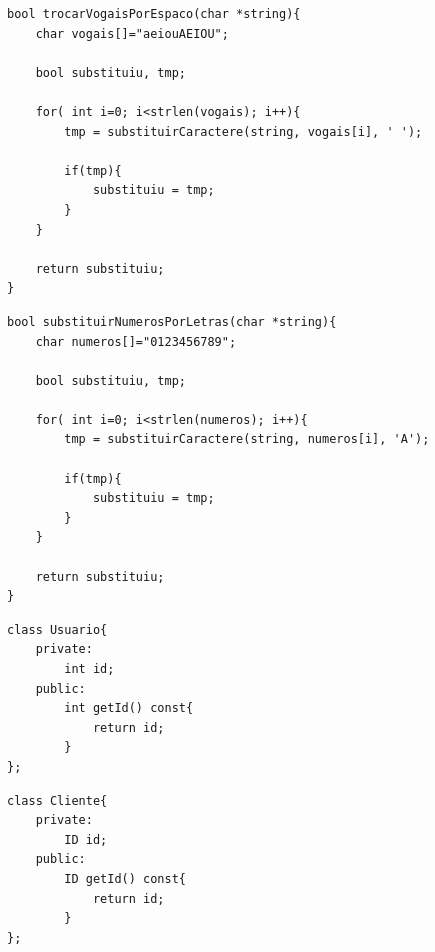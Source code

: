 \begin{frame}[fragile]

	\begin{listing}[H]
		\begin{verbatim}
bool trocarVogaisPorEspaco(char *string){
	char vogais[]="aeiouAEIOU";

	bool substituiu, tmp;

	for( int i=0; i<strlen(vogais); i++){
		tmp = substituirCaractere(string, vogais[i], ' ');

		if(tmp){
			substituiu = tmp;
		}
	}

	return substituiu;
}
		\end{verbatim}
	\end{listing}

\end{frame}

\begin{frame}[fragile]

	\begin{listing}[H]
		\begin{verbatim}
bool substituirNumerosPorLetras(char *string){
	char numeros[]="0123456789";

	bool substituiu, tmp;

	for( int i=0; i<strlen(numeros); i++){
		tmp = substituirCaractere(string, numeros[i], 'A');

		if(tmp){
			substituiu = tmp;
		}
	}

	return substituiu;
}
		\end{verbatim}
	\end{listing}

\end{frame}


\begin{frame}[fragile]

	\begin{listing}[H]
		\begin{verbatim}
class Usuario{
	private:
		int id;
	public:
		int getId() const{
			return id;
		}
};
		\end{verbatim}
	\end{listing}

\end{frame}

\begin{frame}[fragile]

	\begin{listing}[H]
		\begin{verbatim}
class Cliente{
	private:
		ID id;
	public:
		ID getId() const{
			return id;
		}
};
		\end{verbatim}
	\end{listing}

\end{frame}

